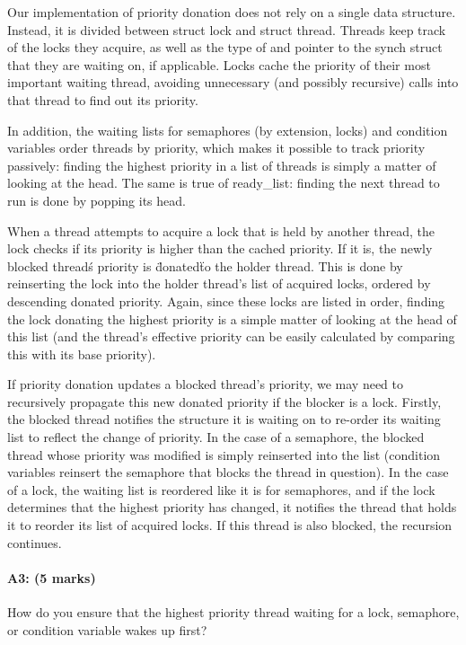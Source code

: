 Our implementation of priority donation does not rely on a single data structure. Instead, it is divided between struct lock and struct thread. Threads keep track of the locks they acquire, as well as the type of and pointer to the synch struct that they are waiting on, if applicable. Locks cache the priority of their most important waiting thread, avoiding unnecessary (and possibly recursive) calls into that thread to find out its priority.

In addition, the waiting lists for semaphores (by extension, locks) and condition variables order threads by priority, which makes it possible to track priority passively: finding the highest priority in a list of threads is simply a matter of looking at the head. The same is true of ready_list: finding the next thread to run is done by popping its head.

When a thread attempts to acquire a lock that is held by another thread, the lock checks if its priority is higher than the cached priority. If it is, the newly blocked thread\'s priority is \"donated\" to the holder thread. This is done by reinserting the lock into the holder thread's list of acquired locks, ordered by descending donated priority. Again, since these locks are listed in order, finding the lock donating the highest priority is a simple matter of looking at the head of this list (and the thread's effective priority can be easily calculated by comparing this with its base priority).

If priority donation updates a blocked thread's priority, we may need to recursively propagate this new donated priority if the blocker is a lock. Firstly, the blocked thread notifies the structure it is waiting on to re-order its waiting list to reflect the change of priority.
In the case of a semaphore, the blocked thread whose priority was modified is simply reinserted into the list (condition variables reinsert the semaphore that blocks the thread in question).
In the case of a lock, the waiting list is reordered like it is for semaphores, and if the lock determines that the highest priority has changed, it notifies the thread that holds it to reorder its list of acquired locks. If this thread is also blocked, the recursion continues.

\paragraph{A3: (5 marks)}
How do you ensure that the highest priority thread waiting for a lock, semaphore, or condition variable wakes up first?

